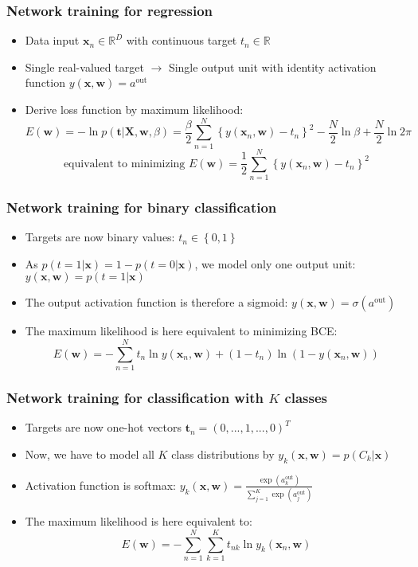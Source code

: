 \subsubsection{Network training for regression}
\begin{itemize}
	\item Data input $\bm{x}_n \in \mathbb{R}^{D}$ with continuous target $t_n \in \mathbb{R}$
	\item Single real-valued target $\to$ Single output unit with identity activation function $y\left(\bm{x}, \bm{w}\right) = a^{\text{out}}$
	\item Derive loss function by maximum likelihood:
	$$E(\bm{w}) = -\ln p\left(\bm{t}|\bm{X}, \bm{w}, \beta \right) = \frac{\beta}{2}\sum\limits_{n=1}^{N}\left\{y(\bm{x}_n, \bm{w}) - t_n\right\}^2 - \frac{N}{2}\ln\beta + \frac{N}{2}\ln 2\pi $$
	$$\text{equivalent to minimizing } E(\bm{w})=\frac{1}{2}\sum\limits_{n=1}^{N}\left\{y(\bm{x}_n, \bm{w}) - t_n\right\}^2$$
\end{itemize}
\subsubsection{Network training for binary classification}
\begin{itemize}
	\item Targets are now binary values: $t_n\in\left\{0,1\right\}$
	\item As $p\left(t=1|\bm{x}\right) = 1 - p\left(t=0|\bm{x}\right)$, we model only one output unit: $y\left(\bm{x},\bm{w}\right) = p\left(t=1|\bm{x}\right)$
	\item The output activation function is therefore a sigmoid: $y\left(\bm{x}, \bm{w}\right) = \sigma\left(a^{\text{out}}\right)$
	\item The maximum likelihood is here equivalent to minimizing BCE: $$E\left(\bm{w}\right) = -\sum\limits_{n=1}^{N} t_n \ln y\left(\bm{x}_n, \bm{w}\right) + (1 - t_n) \ln \left(1 - y\left(\bm{x}_n, \bm{w}\right)\right)$$
\end{itemize}
\subsubsection{Network training for classification with $K$ classes}
\begin{itemize}
	\item Targets are now one-hot vectors $\bm{t}_n = \left(0,...,1,...,0\right)^T$
	\item Now, we have to model all $K$ class distributions by $y_k\left(\bm{x}, \bm{w}\right) = p\left(C_k|\bm{x}\right)$
	\item Activation function is softmax: $y_k\left(\bm{x}, \bm{w}\right) = \frac{\exp\left(a_k^{\text{out}}\right)}{\sum_{j=1}^{K}\exp\left(a_j^{\text{out}}\right)}$
	\item The maximum likelihood is here equivalent to:
	$$E\left(\bm{w}\right) = - \sum\limits_{n=1}^{N} \sum\limits_{k=1}^{K} t_{nk} \ln y_k\left(\bm{x}_n, \bm{w}\right)$$
\end{itemize}
